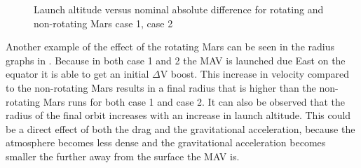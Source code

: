 \begin{figure}[H]
\centering
{} 
\caption{Launch altitude versus nominal absolute difference for rotating and non-rotating Mars \protect{} case 1,  \protect{} case 2 } 
\label{fig:launchAltitudeVsNominalAbsoluteDifferenceCase1combinedSmall} 
\end{figure} 

\noindent
Another example of the effect of the rotating Mars can be seen in the radius graphs in . Because in both case 1 and 2 the \ac{MAV} is launched due East on the equator it is able to get an initial $\Delta$V boost. This increase in velocity compared to the non-rotating Mars results in a final radius that is higher than the non-rotating Mars runs for both case 1 and case 2. It can also be observed that the radius of the final orbit increases with an increase in launch altitude. This could be a direct effect of both the drag and the gravitational acceleration, because the atmosphere becomes less dense and the gravitational acceleration becomes smaller the further away from the surface the \ac{MAV} is.



